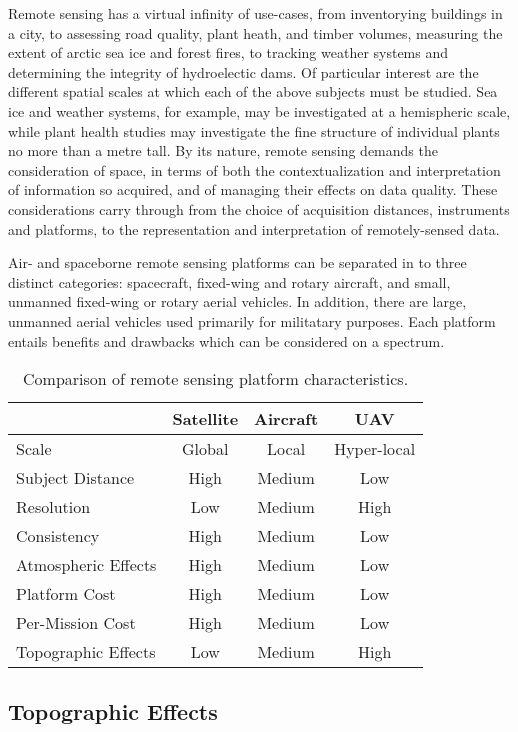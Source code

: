 \documentclass[10pt,a4paper]{report}
\begin{document}
Remote sensing has a virtual infinity of use-cases, from inventorying buildings in a city, to assessing road quality, plant heath, and timber volumes, measuring the extent of arctic sea ice and forest fires, to tracking weather systems and determining the integrity of hydroelectic dams. Of particular interest are the different spatial scales at which each of the above subjects must be studied. Sea ice and weather systems, for example, may be investigated at a hemispheric scale, while plant health studies may investigate the fine structure of individual plants no more than a metre tall. By its nature, remote sensing demands the consideration of space, in terms of both the contextualization and interpretation of information so acquired, and of managing their effects on data quality. These considerations carry through from the choice of acquisition distances, instruments and platforms, to the representation and interpretation of remotely-sensed data.

Air- and spaceborne remote sensing platforms can be separated in to three distinct categories: spacecraft, fixed-wing and rotary aircraft, and small, unmanned fixed-wing or rotary aerial vehicles.  In addition, there are large, unmanned aerial vehicles used primarily for militatary purposes. Each platform entails benefits and drawbacks which can be considered on a spectrum.

\begin{table}
\caption{Comparison of remote sensing platform characteristics.}
\label{table:platforms}
\begin{tabular}{l|ccc}
\hline
 & Satellite & Aircraft & UAV \\
\hline
Scale & Global & Local & Hyper-local \\
Subject Distance & High & Medium & Low \\
Resolution & Low & Medium & High \\
Consistency & High & Medium & Low \\
Atmospheric Effects & High & Medium & Low \\
Platform Cost & High & Medium & Low \\
Per-Mission Cost & High & Medium & Low \\
Topographic Effects & Low & Medium & High \\
\hline
\end{tabular}
\end{table}

\subsection{Topographic Effects}
\end{document}
